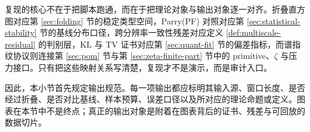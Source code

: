 复现的核心不在于把脚本跑通，而在于把理论对象与输出对象逐一对齐。折叠直方图对应第 \ref{sec:folding} 节的稳定类型空间，Parry(PF) 对照对应第 \ref{sec:statistical-stability} 节的基线分布口径，跨分辨率一致性残差对应定义 \ref{def:multiscale-residual} 的判别层，\(\mathrm{KL}\) 与 \(\mathrm{TV}\) 证书对应第 \ref{sec:quant-fit} 节的偏差指标，而谱指纹协议则连接第 \ref{sec:pom} 节与第 \ref{sec:zeta-finite-part} 节中的 primitive、\(\zeta\) 与压力接口。只有把这些映射关系写清楚，复现才不是演示，而是审计入口。

因此，本小节首先规定输出规范。每一项输出都应标明其输入源、窗口长度、是否经过折叠、是否对比基线、样本预算、误差口径以及所对应的理论命题或定义。图表在本节中不是终点；真正的输出对象是附着在图表背后的证书、残差与可回放的数据切片。
